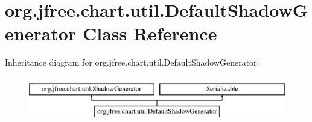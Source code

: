 \hypertarget{classorg_1_1jfree_1_1chart_1_1util_1_1_default_shadow_generator}{}\section{org.\+jfree.\+chart.\+util.\+Default\+Shadow\+Generator Class Reference}
\label{classorg_1_1jfree_1_1chart_1_1util_1_1_default_shadow_generator}
Inheritance diagram for org.\+jfree.\+chart.\+util.\+Default\+Shadow\+Generator\+:\begin{figure}[H]
\begin{center}
\leavevmode
\includegraphics[height=2.000000cm]{classorg_1_1jfree_1_1chart_1_1util_1_1_default_shadow_generator}
\end{center}
\end{figure}
